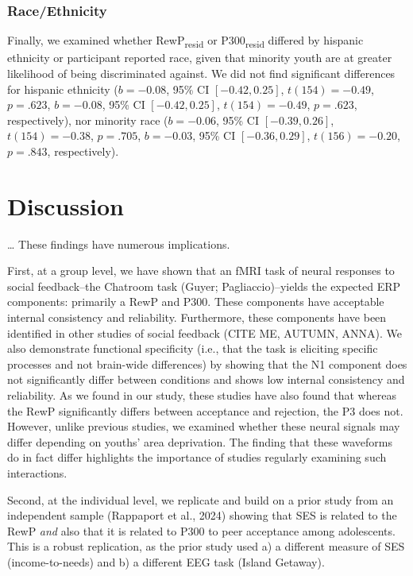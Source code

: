 \documentclass[
  man]{apa7}
\begin{document}
\hypertarget{raceethnicity}{%
\subsubsection{Race/Ethnicity}\label{raceethnicity}}

Finally, we examined whether RewP\textsubscript{resid} or P300\textsubscript{resid} differed by hispanic ethnicity or participant reported race, given that minority youth are at greater likelihood of being discriminated against. We did not find significant differences for hispanic ethnicity (\(b = -0.08\), 95\% CI \([-0.42, 0.25]\), \(t(154) = -0.49\), \(p = .623\), \(b = -0.08\), 95\% CI \([-0.42, 0.25]\), \(t(154) = -0.49\), \(p = .623\), respectively), nor minority race (\(b = -0.06\), 95\% CI \([-0.39, 0.26]\), \(t(154) = -0.38\), \(p = .705\), \(b = -0.03\), 95\% CI \([-0.36, 0.29]\), \(t(156) = -0.20\), \(p = .843\), respectively).

\hypertarget{discussion}{%
\section{Discussion}\label{discussion}}

\ldots{} These findings have numerous implications.

First, at a group level, we have shown that an fMRI task of neural responses to social feedback--the Chatroom task (Guyer; Pagliaccio)--yields the expected ERP components: primarily a RewP and P300. These components have acceptable internal consistency and reliability. Furthermore, these components have been identified in other studies of social feedback (CITE ME, AUTUMN, ANNA). We also demonstrate functional specificity (i.e., that the task is eliciting specific processes and not brain-wide differences) by showing that the N1 component does not significantly differ between conditions and shows low internal consistency and reliability. As we found in our study, these studies have also found that whereas the RewP significantly differs between acceptance and rejection, the P3 does not. However, unlike previous studies, we examined whether these neural signals may differ depending on youths' area deprivation. The finding that these waveforms do in fact differ highlights the importance of studies regularly examining such interactions.

Second, at the individual level, we replicate and build on a prior study from an independent sample (Rappaport et al., 2024) showing that SES is related to the RewP \emph{and} also that it is related to P300 to peer acceptance among adolescents. This is a robust replication, as the prior study used a) a different measure of SES (income-to-needs) and b) a different EEG task (Island Getaway).
\end{document}
